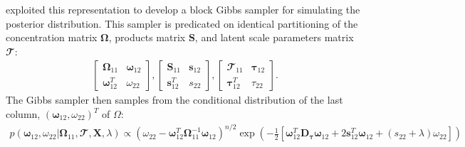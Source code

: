 \begin{DoubleSpace*}
\cite{wang2012} exploited this representation to develop a block Gibbs sampler for simulating the posterior distribution. This sampler is predicated on identical partitioning of the concentration matrix $\boldsymbol{\Omega}$, products matrix $\boldsymbol{S}$, and latent scale parameters matrix $\mathbfcal{T}$:
\begin{align}
\begin{bmatrix}
\boldsymbol{\Omega}_{11} & \boldsymbol{\omega}_{12} \\
\boldsymbol{\omega}_{12}^T & \omega_{22}
\end{bmatrix},
\begin{bmatrix}
\mathbf{S}_{11} & \mathbf{s}_{12} \\
\mathbf{s}_{12}^T & s_{22}
\end{bmatrix},
\begin{bmatrix}
\mathbfcal{T}_{11} & \boldsymbol{\tau}_{12} \\
\boldsymbol{\tau}_{12}^T & \tau_{22}
\end{bmatrix}.
\end{align}
The Gibbs sampler then samples from the conditional distribution of the last column, $(\boldsymbol{\omega}_{12}, \omega_{22})^T$ of $\Omega$:
\begin{align}
p(\boldsymbol{\omega}_{12}, \omega_{22}|\boldsymbol{\Omega}_{11},\mathbfcal{T},\textbf{X},\lambda) \propto \left(\omega_{22}-\boldsymbol{\omega}_{12}^T \boldsymbol{\Omega}_{11}^{-1}\boldsymbol{\omega}_{12} \right)^{n/2} \exp \left( - \frac{1}{2}\left[ \boldsymbol{\omega}_{12}^T \textbf{D}_{\boldsymbol{\tau}} \boldsymbol{\omega}_{12}+ 2 
\textbf{s}_{12}^T \boldsymbol{\omega}_{12} + (s_{22}+\lambda)\omega_{22}\right] \right)
\end{align}


\end{DoubleSpace*}

